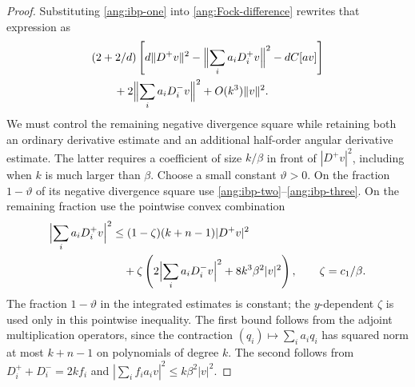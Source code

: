 \begin{proof}
Substituting \eqref{ang:ibp-one} into
\eqref{ang:Fock-difference} rewrites that expression as
\begin{equation}\label{ang:after-first-ibp}
 \begin{split}
 &(2+2/d)\left[d\|D^+v\|^2
       -\Bigl\|\sum_i a_iD_i^+v\Bigr\|^2-dC[av]\right]\\
 &\qquad+2\Bigl\|\sum_i a_iD_i^-v\Bigr\|^2
                      +O(k^3)\|v\|^2.
 \end{split}
\end{equation}
We must control the remaining negative divergence square while retaining
both an ordinary derivative estimate and an additional half-order
angular derivative estimate.  The latter requires a coefficient of
size $k/\beta$ in front of $|D^+v|^2$, including when $k$ is much larger
than $\beta$.  Choose a small constant $\vartheta>0$.
On the fraction $1-\vartheta$ of its negative divergence square use
\eqref{ang:ibp-two}--\eqref{ang:ibp-three}.  On the remaining
fraction use the pointwise convex combination
\begin{equation}\label{ang:convex-bound}
 \begin{split}
 \Bigl|\sum_i a_iD_i^+v\Bigr|^2
 &\le(1-\zeta)(k+n-1)|D^+v|^2\\
 &\quad+\zeta\left(2\Bigl|\sum_i a_iD_i^-v\Bigr|^2
                         +8k^3\beta^2|v|^2\right),
 \qquad \zeta=c_1/\beta.
 \end{split}
\end{equation}
The fraction $1-\vartheta$ in the integrated estimates is constant;
the $y$-dependent $\zeta$ is used only in this pointwise inequality.
The first bound follows from the adjoint multiplication operators, since
the contraction $(q_i)\mapsto\sum_i a_iq_i$ has squared norm at most
$k+n-1$ on polynomials of degree $k$.  The second follows from
$D_i^++D_i^-=2k f_i$ and
$|\sum_i f_i a_i v|^2\le k\beta^2|v|^2$.


\end{proof}
